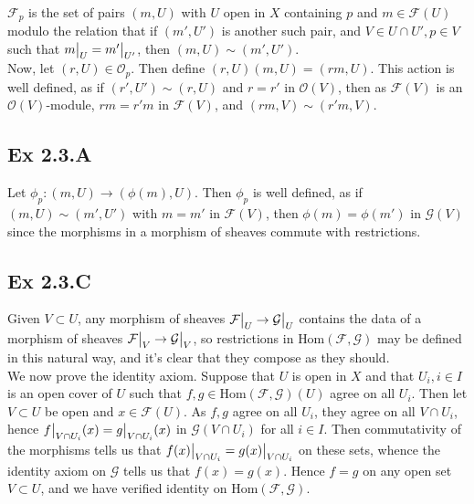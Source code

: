\documentclass{article}
\newcommand\restr[2]{{%
  \left.\kern-\nulldelimiterspace %
  #1 %
  \vphantom{\big|} %
  \right|_{#2} %
  }}
\theoremstyle{definition}
\newcommand{\Hom}{\text{Hom}}
\begin{document}
$\mathcal{F}_{p}$ is the set of pairs $(m, U)$ with $U$ open in $X$ containing
$p$ and $m \in \mathcal{F}(U)$ modulo the relation that if $(m', U')$ is
another such pair, and $V \in U \cap U', p \in V$ such that $\restr{m}{U} =
\restr{m'}{U'}$, then $(m, U) \sim (m', U')$. \\

Now, let $(r, U) \in \mathcal{O}_p$. Then define $(r, U) (m, U) = (rm, U)$.
This action is well defined, as if $(r', U') \sim (r, U)$ and $r = r'$ in
$\mathcal{O}(V)$, then as $\mathcal{F}(V)$ is an $\mathcal{O}(V)$-module, $rm =
r'm$ in $\mathcal{F}(V)$, and $(rm, V) \sim (r'm, V)$.

 
\subsection*{Ex 2.3.A}

Let $\phi_p : (m, U) \to (\phi(m), U)$. Then $\phi_p$ is well defined, as if
$(m, U) \sim (m', U')$ with $m = m'$ in $\mathcal{F}(V)$, then $\phi(m) =
\phi(m')$ in $\mathcal{G}(V)$ since the morphisms in a morphism of sheaves
commute with restrictions.

\subsection*{Ex 2.3.C}

Given $V \subset U$, any morphism of sheaves $\restr{\mathcal{F}}{U} \to
\restr{\mathcal{G}}{U}$ contains the data of a morphism of sheaves
$\restr{\mathcal{F}}{V} \to \restr{\mathcal{G}}{V}$, so restrictions in
$\Hom(\mathcal{F}, \mathcal{G})$ may be defined in this natural way, and it's
clear that they compose as they should. \\

We now prove the identity axiom. Suppose that $U$ is open in $X$ and that $U_i,
i \in I$ is an open cover of $U$ such that $f, g \in \Hom(\mathcal{F},
\mathcal{G})(U)$ agree on all $U_i$. Then let $V \subset U$ be open and $x \in
\mathcal{F}(U)$. As $f, g$ agree on all $U_i$, they agree on all $V \cap U_i$,
hence $\restr{f}{V \cap U_i}(x) = \restr{g}{V \cap U_i}(x)$ in $\mathcal{G}(V
\cap U_i)$ for all $i \in I$. Then commutativity of the morphisms tells us that
$\restr{f(x)}{V \cap U_i} = \restr{g(x)}{V \cap U_i}$ on these sets, whence the
identity axiom on $\mathcal{G}$ tells us that $f(x) = g(x)$. Hence $f = g$ on
any open set $V \subset U$, and we have verified identity on $\Hom(\mathcal{F},
\mathcal{G})$. \\
\end{document}
